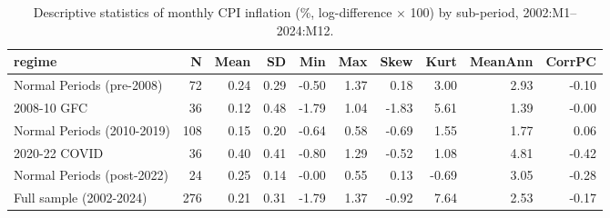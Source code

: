 \begin{table}[ht]
\centering
\begin{tabular}{lrrrrrrrrr}
  \toprule
regime & N & Mean & SD & Min & Max & Skew & Kurt & MeanAnn & CorrPC \\ 
  \midrule
Normal Periods (pre-2008) &  72 & 0.24 & 0.29 & -0.50 & 1.37 & 0.18 & 3.00 & 2.93 & -0.10 \\ 
  2008-10 GFC &  36 & 0.12 & 0.48 & -1.79 & 1.04 & -1.83 & 5.61 & 1.39 & -0.00 \\ 
  Normal Periods (2010-2019) & 108 & 0.15 & 0.20 & -0.64 & 0.58 & -0.69 & 1.55 & 1.77 & 0.06 \\ 
  2020-22 COVID &  36 & 0.40 & 0.41 & -0.80 & 1.29 & -0.52 & 1.08 & 4.81 & -0.42 \\ 
  Normal Periods (post-2022) &  24 & 0.25 & 0.14 & -0.00 & 0.55 & 0.13 & -0.69 & 3.05 & -0.28 \\ 
  Full sample (2002-2024) & 276 & 0.21 & 0.31 & -1.79 & 1.37 & -0.92 & 7.64 & 2.53 & -0.17 \\ 
   \bottomrule
\end{tabular}
\caption{Descriptive statistics of monthly CPI inflation (\%, log-difference \(\times\) 100) by sub-period, 2002:M1--2024:M12.} 
\label{tab:desc_regime}
\end{table}
